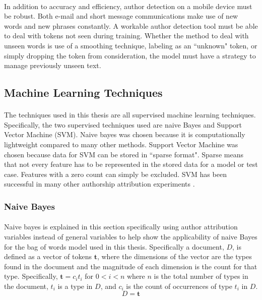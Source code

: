 	\paragraph*{} In addition to accuracy and efficiency, author detection on a mobile device must be robust.  Both e-mail and short message communications make use of new words and new phrases constantly.  A workable author detection tool must be able to deal with tokens not seen during training.  Whether the method to deal with unseen words is use of a smoothing technique, labeling as an ``unknown" token, or simply dropping the token from consideration, the model must have a strategy to manage previously unseen text.

	\subsection {Machine Learning Techniques}
		\paragraph{}The techniques used in this thesis are all supervised machine learning techniques.  Specifically, the two supervised techniques used are naive Bayes and Support Vector Machine (SVM).  Naive bayes was chosen because it is computationally lightweight compared to many other methods.  Support Vector Machine was chosen because data for SVM can be stored in ``sparse format".  Sparse means that not every feature has to be represented in the stored data for a model or test case.  Features with a zero count can simply be excluded.  SVM has been successful in many other authorship attribution experiments \cite{jurafsky_speech_2009}.

		\subsubsection{Naive Bayes}
		\paragraph*{} Naive bayes is explained in this section specifically using author attribution variables instead of general variables to help show the applicability of naive Bayes for the bag of words model used in this thesis.  Specifically a document, $D$, is defined as a vector of tokens $\mathbf{t}$, where the dimensions of the vector are the types found in the document and the magnitude of each dimension is the count for that type.  Specifically, $\mathbf{t} = c_i t_i $ for $ 0 < i < n $ where $n$ is the total number of types in the document, $t_i$ is a type in $D$, and $c_i$ is the count of occurrences of type $t_i$ in $D$.
		\begin{equation}D = \mathbf{t}\end{equation}
		
